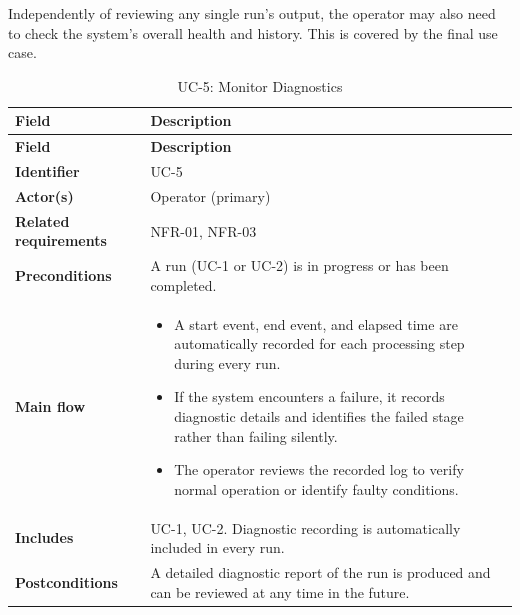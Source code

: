 
Independently of reviewing any single run's output, the operator may also need to check the system's overall health and history. This is covered by the final use case.

\begin{longtable}{|
    >{\raggedright\arraybackslash}p{3.0cm}|
    >{\raggedright\arraybackslash}p{\dimexpr\textwidth-3.0cm-4\tabcolsep-3\arrayrulewidth\relax}|
}
\caption{UC-5: Monitor Diagnostics}
\label{tab:uc5} \\

\hline
\textbf{Field} & \textbf{Description} \\
\hline
\endfirsthead

\hline
\textbf{Field} & \textbf{Description} \\
\hline
\endhead

\textbf{Identifier} &
UC-5
\\
\hline

\textbf{Actor(s)} &
Operator (primary)
\\
\hline

\textbf{Related requirements} &
NFR-01, NFR-03
\\
\hline

\textbf{Preconditions} &
A run (UC-1 or UC-2) is in progress or has been completed.
\\
\hline

\textbf{Main flow} &
\begin{itemize}[leftmargin=16pt, itemsep=0pt, topsep=0pt]
    \item A start event, end event, and elapsed time are automatically recorded for each processing step during every run.

    \item If the system encounters a failure, it records diagnostic details and identifies the failed stage rather than failing silently.

    \item The operator reviews the recorded log to verify normal operation or identify faulty conditions.
\end{itemize}
\\
\hline

\textbf{Includes} &
UC-1, UC-2. Diagnostic recording is automatically included in every run.
\\
\hline

\textbf{Postconditions} &
A detailed diagnostic report of the run is produced and can be reviewed at any time in the future.
\\
\hline

\end{longtable}